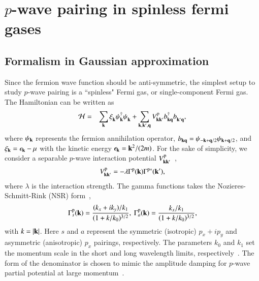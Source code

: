 \documentclass[aps,prd,amsmath,two column,nofootinbib,amssymb,referee]{revtex4}
\begin{document}
\section{$p$-wave pairing in spinless fermi gases}\label{chapterp}

\subsection{Formalism in Gaussian approximation}\label{sectionpA}

Since the fermion wave function should be anti-symmetric, the simplest setup to study $p$-wave pairing is a ``spinless" Fermi gas, or single-component Fermi gas. The Hamiltonian can be written as~\cite{Read2000,Botelho2005a}
\begin{eqnarray}
{\cal H}&=&\sum_{{\bf k}}\xi_{{\bf k}}^{\phantom{\dag}}\psi_{{\bf k}}^\dagger\psi_{{\bf k}}^{\phantom{\dag}}+\sum_{{\bf k,k',q}}V_{{\bf kk'}}^{\rm p}b_{{\bf kq}}^\dagger b_{{\bf k'q}}^{\phantom{\dag}},
\end{eqnarray}
where $\psi_{{\bf k}}$ represents the fermion annihilation operator, $b_{{\bf kq}}=\psi_{{\bf -k+q}/2}\psi_{{\bf k+q}/2}$, and $\xi_{{\bf k}}=\epsilon_{{\bf k}}-\mu$ with the kinetic energy $\epsilon_{{\bf k}}={\bf k}^2/(2m)$. 
For the sake of simplicity, we consider a separable $p$-wave interaction potential $V_{{\bf kk'}}^{\rm p}$~\cite{Cao2013},
\begin{eqnarray}
V_{{\bf kk'}}^{\rm p}=-\lambda\Gamma^{\rm p}({\bf k})\Gamma^{\rm p*}({\bf k'}),
\end{eqnarray}
where $\lambda$ is the interaction strength.  The gamma functions takes the Nozieres-Schmitt-Rink (NSR) form~\cite{Nozieres1985, Botelho2005a},
\begin{eqnarray}
\Gamma^{\rm p}_s({\bf k})={(k_x+ik_y)/k_1\over(1+k/k_0)^{3/2}},\ \Gamma^{\rm p}_a({\bf k})={k_x/k_1\over(1+k/k_0)^{3/2}},
\end{eqnarray}
with $k=|{\bf k}|$. Here $s$ and $a$ represent the symmetric (isotropic) $p_x+ip_y$ and asymmetric (anisotropic) $p_x$ pairings, respectively. The parameters $k_0$ and $k_1$ set the momentum scale in the short  and long wavelength limits, respectively~\cite{Botelho2005a}. The form of the denominator is chosen to mimic the amplitude damping for $p$-wave partial potential at large momentum~\cite{Botelho2005a}.
\end{document}
